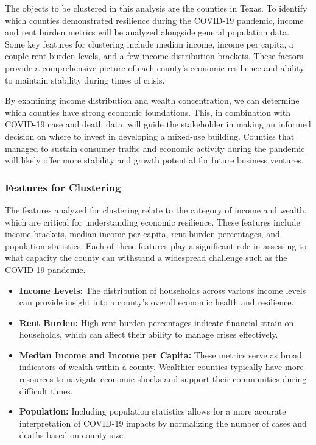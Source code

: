 \documentclass[
]{article}
\providecommand{\tightlist}{%
  \setlength{\itemsep}{0pt}\setlength{\parskip}{0pt}}
\begin{document}
The objects to be clustered in this analysis are the counties in Texas.
To identify which counties demonstrated resilience during the COVID-19
pandemic, income and rent burden metrics will be analyzed alongside
general population data. Some key features for clustering include median
income, income per capita, a couple rent burden levels, and a few income
distribution brackets. These factors provide a comprehensive picture of
each county's economic resilience and ability to maintain stability
during times of crisis.

By examining income distribution and wealth concentration, we can
determine which counties have strong economic foundations. This, in
combination with COVID-19 case and death data, will guide the
stakeholder in making an informed decision on where to invest in
developing a mixed-use building. Counties that managed to sustain
consumer traffic and economic activity during the pandemic will likely
offer more stability and growth potential for future business ventures.

\subsubsection{Features for Clustering}\label{features-for-clustering}

The features analyzed for clustering relate to the category of income
and wealth, which are critical for understanding economic resilience.
These features include income brackets, median income per capita, rent
burden percentages, and population statistics. Each of these features
play a significant role in assessing to what capacity the county can
withstand a widespread challenge such as the COVID-19 pandemic.

\begin{itemize}
\tightlist
\item
  \textbf{Income Levels:} The distribution of households across various
  income levels can provide insight into a county's overall economic
  health and resilience.
\item
  \textbf{Rent Burden:} High rent burden percentages indicate financial
  strain on households, which can affect their ability to manage crises
  effectively.
\item
  \textbf{Median Income and Income per Capita:} These metrics serve as
  broad indicators of wealth within a county. Wealthier counties
  typically have more resources to navigate economic shocks and support
  their communities during difficult times.
\item
  \textbf{Population:} Including population statistics allows for a more
  accurate interpretation of COVID-19 impacts by normalizing the number
  of cases and deaths based on county size.
\end{itemize}
\end{document}
